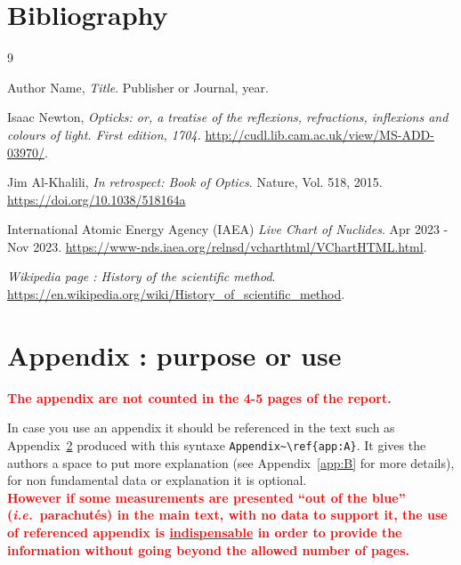\documentclass[a4paper, twocolumn]{article}
\newcommand{\ie}{\textit{i.e.}~}
\begin{document}
\section{Bibliography}
\begin{thebibliography}{9}  %

  Author Name,
  \textit{Title}.
  Publisher or Journal, year.

Isaac Newton, \textit{Opticks: or, a treatise of the reflexions, refractions, inflexions and colours of light. First edition, 1704. }\url{http://cudl.lib.cam.ac.uk/view/MS-ADD-03970/}.


  Jim Al-Khalili,
  \textit{In retrospect: Book of Optics}.
  Nature, Vol. 518, 2015.
  \url{https://doi.org/10.1038/518164a}

International Atomic Energy Agency (IAEA) \emph{Live Chart of Nuclides}. Apr 2023 - Nov 2023. \url{https://www-nds.iaea.org/relnsd/vcharthtml/VChartHTML.html}.

\emph{Wikipedia page : History of the scientific method}. \url{https://en.wikipedia.org/wiki/History_of_scientific_method}.


\end{thebibliography}



\appendix
\section{Appendix : purpose or use} \label{app:A}  %
\textcolor{red}{\bf The appendix are not counted in the 4-5 pages of the report.\\}

In case you use an appendix it should be referenced in the text such as Appendix~\ref{app:A} produced with this syntaxe
 \verb|Appendix~\ref{app:A}|.
%
It gives the authors a space to put more explanation (see Appendix~\ref{app:B} for more details), for non fundamental data or explanation it is optional.\\

\textcolor{red}{\bf However if some measurements are presented ``out of the blue'' (\ie parachut\'es) in the main text, with no data to support it, the use of referenced appendix is \underline{indispensable} in order to provide the information without going beyond the allowed number of pages.}
\end{document}
